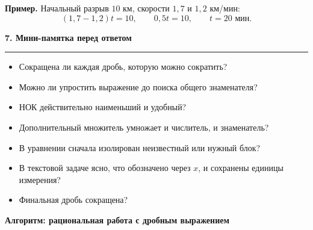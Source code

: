 \documentclass[a4paper,12pt]{article}
\newcommand{\sectiontitle}[1]{%
  \vspace{0.7em}
  {\large\bfseries\color{darkaccent}#1}\par
  \vspace{0.2em}\color{linegray}\hrule\color{textgray}\vspace{0.55em}
}
\newcommand{\ex}[1]{\textbf{Пример.} #1}
\begin{document}
\ex{Начальный разрыв \(10\) км, скорости \(1{,}7\) и \(1{,}2\) км/мин:}
\[
(1{,}7-1{,}2)t=10,\qquad 0{,}5t=10,\qquad \boxed{t=20\text{ мин}}.
\]

\sectiontitle{7. Мини-памятка перед ответом}

\begin{itemize}
  \item Сокращена ли каждая дробь, которую можно сократить?
  \item Можно ли упростить выражение до поиска общего знаменателя?
  \item НОК действительно наименьший и удобный?
  \item Дополнительный множитель умножает и числитель, и знаменатель?
  \item В уравнении сначала изолирован неизвестный или нужный блок?
  \item В текстовой задаче ясно, что обозначено через \(x\), и сохранены единицы измерения?
  \item Финальная дробь сокращена?
\end{itemize}

\clearpage
\thispagestyle{fancy}
\begin{center}
{\Large\bfseries\color{darkaccent} Алгоритм: рациональная работа с дробным выражением}
\end{center}
\vspace{8mm}
\end{document}
